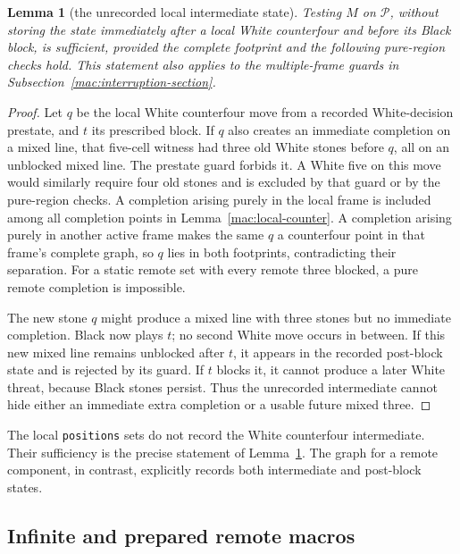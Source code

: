 \documentclass[11pt]{article}
\newtheorem{lemma}[theorem]{Lemma}
\theoremstyle{definition}
\theoremstyle{remark}
\begin{document}
\begin{lemma}[the unrecorded local intermediate state]\label{mac:intermediate}
Testing \(M\) on \(\mathcal P\), without storing the state immediately after a local White counterfour and before its Black block, is sufficient, provided the complete footprint and the following pure-region checks hold. This statement also applies to the multiple-frame guards in Subsection~\ref{mac:interruption-section}.

\end{lemma}
\begin{proof}
Let \(q\) be the local White counterfour move from a recorded White-decision prestate, and \(t\) its prescribed block. If \(q\) also creates an immediate completion on a mixed line, that five-cell witness had three old White stones before \(q\), all on an unblocked mixed line. The prestate guard forbids it. A White five on this move would similarly require four old stones and is excluded by that guard or by the pure-region checks. A completion arising purely in the local frame is included among all completion points in Lemma~\ref{mac:local-counter}. A completion arising purely in another active frame makes the same \(q\) a counterfour point in that frame's complete graph, so \(q\) lies in both footprints, contradicting their separation. For a static remote set with every remote three blocked, a pure remote completion is impossible.

The new stone \(q\) might produce a mixed line with three stones but no immediate completion. Black now plays \(t\); no second White move occurs in between. If this new mixed line remains unblocked after \(t\), it appears in the recorded post-block state and is rejected by its guard. If \(t\) blocks it, it cannot produce a later White threat, because Black stones persist. Thus the unrecorded intermediate cannot hide either an immediate extra completion or a usable future mixed three. 
\end{proof}

The local \texttt{positions} sets do not record the White counterfour intermediate. Their sufficiency is the precise statement of Lemma~\ref{mac:intermediate}. The graph for a remote component, in contrast, explicitly records both intermediate and post-block states.

\subsection{Infinite and prepared remote macros}\label{mac:static-section}
\end{document}

